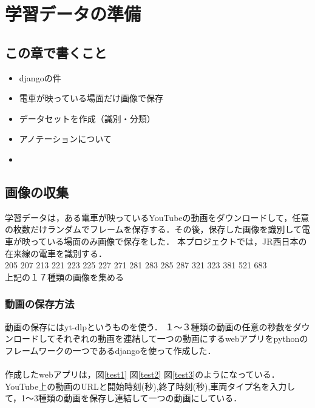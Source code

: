 

\chapter{学習データの準備}\label{genri}
\section{この章で書くこと}
\begin{itemize}
	\item djangoの件
	\item 電車が映っている場面だけ画像で保存
	\item データセットを作成（識別・分類）
	\item アノテーションについて
	\item 
\end{itemize}

\section{画像の収集}
学習データは，ある電車が映っているYouTubeの動画をダウンロードして，任意の枚数だけランダムでフレームを保存する．その後，保存した画像を識別して電車が映っている場面のみ画像で保存をした．
本プロジェクトでは，JR西日本の在来線の電車を識別する．\\
205  207  213  221  223  225  227  271  281  283  285  287  321  323  381  521  683 \\
上記の１７種類の画像を集める
\subsection{動画の保存方法}
動画の保存にはyt-dlpというものを使う．
１〜３種類の動画の任意の秒数をダウンロードしてそれぞれの動画を連結して一つの動画にするwebアプリをpythonのフレームワークの一つであるdjangoを使って作成した．\\
	\\
	作成したwebアプリは，図\ref{test1} 図\ref{test2}  図\ref{test3}のようになっている．
	YouTube上の動画のURLと開始時刻(秒),終了時刻(秒),車両タイプ名を入力して，1〜3種類の動画を保存し連結して一つの動画にしている．
	
